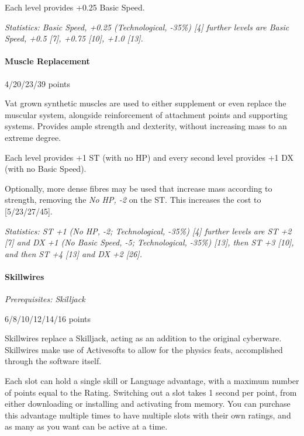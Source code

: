 \begin{multicols*}{3}
	Each level provides +0.25 Basic Speed.
	
	\textit{\textcolor{OliveGreen}{Statistics: Basic Speed, +0.25 (Technological, -35\%) [4] further levels are Basic Speed, +0.5 [7], +0.75 [10], +1.0 [13].}}
	
	\paragraph{Muscle Replacement}
	\begin{flushright}
		4/20/23/39 points
	\end{flushright}
	
	Vat grown synthetic muscles are used to either supplement or even replace the muscular system, alongside reinforcement of attachment points and supporting systems. Provides ample strength and dexterity, without increasing mass to an extreme degree.
	
	Each level provides +1 ST (with no HP) and every second level provides +1 DX (with no Basic Speed).
	
	Optionally, more dense fibres may be used that increase mass according to strength, removing the \textit{No HP, -2} on the ST. This increases the cost to [5/23/27/45].
	
	\textit{\textcolor{OliveGreen}{Statistics: ST +1 (No HP, -2; Technological, -35\%) [4] further levels are ST +2 [7] and DX +1 (No Basic Speed, -5; Technological, -35\%) [13], then ST +3 [10], and then ST +4 [13] and DX +2 [26].}}
	
	\paragraph{Skillwires}
	\textit{Prerequisites: Skilljack}
	\begin{flushright}
		6/8/10/12/14/16 points
	\end{flushright}
	
	Skillwires replace a Skilljack, acting as an addition to the original cyberware. Skillwires make use of Activesofts to allow for the physics feats, accomplished through the software itself. 
	
	Each slot can hold a single skill or Language advantage, with a maximum number of points equal to the Rating. Switching out a slot takes 1 second per point, from either downloading or installing and activating from memory. You can purchase this advantage multiple times to have multiple slots with their own ratings, and as many as you want can be active at a time.
	

\end{multicols*}
